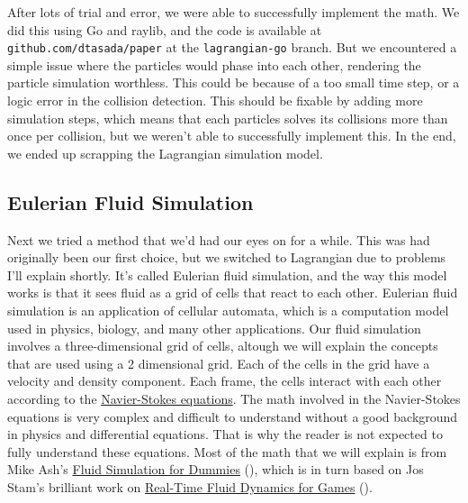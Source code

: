 \documentclass[a4paper,12pt]{article}
\begin{document}
After lots of trial and error, we were able to successfully implement the math.
We did this using Go and raylib, and the code is available at
\verb|github.com/dtasada/paper| at the \verb|lagrangian-go| branch.
But we encountered a simple issue where the particles would phase into each other,
rendering the particle simulation worthless.
This could be because of a too small time step, or a logic error in the collision
detection. This should be fixable by adding more simulation steps, which means
that each particles solves its collisions more than once per collision, but we
weren't able to successfully implement this. In the end, we ended up scrapping
the Lagrangian simulation model.

\subsection{Eulerian Fluid Simulation}
Next we tried a method that we'd had our eyes on for a while. This was had
originally been our first choice, but we switched to Lagrangian due to problems
I'll explain shortly. It's called Eulerian fluid simulation, and the way this
model works is that it sees fluid as a grid of cells that react to each other.
Eulerian fluid simulation is an application of cellular automata, which is a
computation model used in physics, biology, and many other applications.
Our fluid simulation involves a three-dimensional grid of cells, altough we will explain the concepts that are used using a 2 dimensional grid.
Each of the cells in the grid have a velocity and density component.
Each frame, the cells interact with each other according to the
\hyperlink{https://en.wikipedia.org/wiki/Navier\%E2\%80\%93Stokes_equations}{Navier-Stokes equations}.
The math involved in the Navier-Stokes equations is very complex and
difficult to understand without a good background in physics and differential
equations. That is why the reader is not expected to fully understand these equations. 
Most of the math that we will explain is from Mike Ash's
\hyperlink{https://mikeash.com/pyblog/fluid-simulation-for-dummies.html}{Fluid Simulation for Dummies}
(\cite{mikeash}), which is in turn based on Jos Stam's brilliant work on
\hyperlink{http://graphics.cs.cmu.edu/nsp/course/15-464/Fall09/papers/StamFluidforGames.pdf}{Real-Time Fluid Dynamics for Games} (\cite{josstam}).

\end{document}
